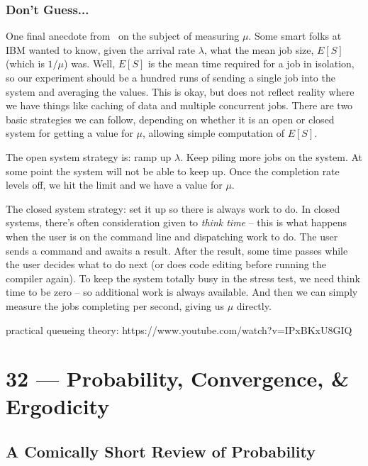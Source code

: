 \documentclass[a4paper]{report}
\begin{document}
\subsection*{Don't Guess...}
One final anecdote from~\cite{pmd} on the subject of measuring $\mu$. Some smart folks at IBM wanted to know, given the arrival rate $\lambda$, what the mean job size, $E[S]$ (which is $1/\mu$) was. Well, $E[S]$ is the mean time required for a job in isolation, so our experiment should be a hundred runs of sending a single job into the system and averaging the values. This is okay, but does not reflect reality where we have things like caching of data and multiple concurrent jobs. There are two basic strategies we can follow, depending on whether it is an open or closed system for getting a value for $\mu$, allowing simple computation of $E[S]$.

The open system strategy is: ramp up $\lambda$. Keep piling more jobs on the system. At some point the system will not be able to keep up. Once the completion rate levels off, we hit the limit and we have a value for $\mu$.

The closed system strategy: set it up so there is always work to do. In closed systems, there's often consideration given to \textit{think time} -- this is what happens when the user is on the command line and dispatching work to do. The user sends a command and awaits a result. After the result, some time passes while the user decides what to do next (or does code editing before running the compiler again). To keep the system totally busy in the stress test, we need think time to be zero -- so additional work is always available. And then we can simply measure the jobs completing per second, giving us $\mu$ directly.




practical queueing theory:  https://www.youtube.com/watch?v=IPxBKxU8GIQ





\chapter*{32 --- Probability, Convergence, \& Ergodicity}


\section*{A Comically Short Review of Probability}
\end{document}
